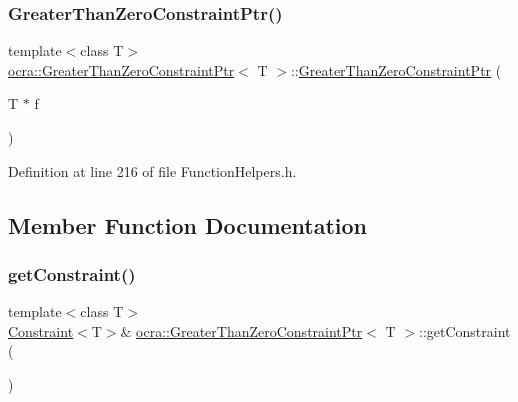 \subsubsection{\texorpdfstring{Greater\+Than\+Zero\+Constraint\+Ptr()}{GreaterThanZeroConstraintPtr()}\hspace{0.1cm}{\footnotesize\ttfamily [2/2]}}
{\footnotesize\ttfamily template$<$class T$>$ \\
\hyperlink{classocra_1_1GreaterThanZeroConstraintPtr}{ocra\+::\+Greater\+Than\+Zero\+Constraint\+Ptr}$<$ T $>$\+::\hyperlink{classocra_1_1GreaterThanZeroConstraintPtr}{Greater\+Than\+Zero\+Constraint\+Ptr} (\begin{DoxyParamCaption}\item[{T $\ast$}]{f }\end{DoxyParamCaption})\hspace{0.3cm}{\ttfamily [inline]}}



Definition at line 216 of file Function\+Helpers.\+h.



\subsection{Member Function Documentation}
\hypertarget{classocra_1_1GreaterThanZeroConstraintPtr_a9ef54456b60a13c1bd518969fc7f3f8b}{}\label{classocra_1_1GreaterThanZeroConstraintPtr_a9ef54456b60a13c1bd518969fc7f3f8b} 
\subsubsection{\texorpdfstring{get\+Constraint()}{getConstraint()}\hspace{0.1cm}{\footnotesize\ttfamily [1/2]}}
{\footnotesize\ttfamily template$<$class T$>$ \\
\hyperlink{classocra_1_1Constraint}{Constraint}$<$T$>$\& \hyperlink{classocra_1_1GreaterThanZeroConstraintPtr}{ocra\+::\+Greater\+Than\+Zero\+Constraint\+Ptr}$<$ T $>$\+::get\+Constraint (\begin{DoxyParamCaption}{ }\end{DoxyParamCaption})\hspace{0.3cm}{\ttfamily [inline]}}



